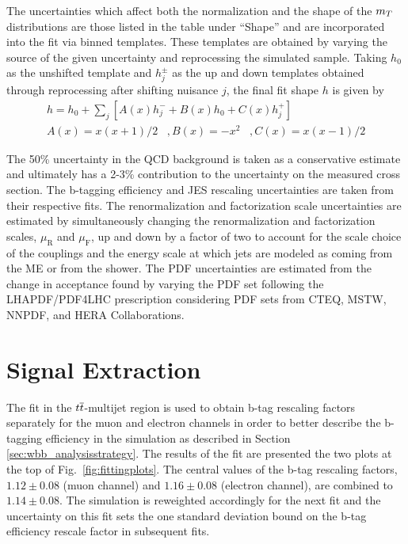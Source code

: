 The uncertainties which affect both the normalization and the
 shape of the $m_T$ distributions
 are those listed in
 the table under ``Shape'' and are
 incorporated into the fit via binned templates.
These templates 
 are obtained by varying the source
 of the given uncertainty and reprocessing the simulated sample.
Taking $h_0$ as the unshifted template
 and $h_j^\pm$ as the up and down templates obtained through reprocessing
 after shifting nuisance $j$, the final fit shape $h$ is given by
\begin{align}\label{eq:fitshape}
 h = h_0 + \sum_j[A(x)h^-_j + B(x)h_0 + C(x)h^+_j]\\
 A(x) = x(x+1)/2\;\;\;,
 B(x) = -x^2\;\;\;,
 C(x) = x(x-1)/2
\end{align}


The 50\% uncertainty in the QCD background is taken as a conservative estimate
 and ultimately has a 2-3\% contribution to the uncertainty on the measured cross section.
The b-tagging efficiency and JES rescaling uncertainties
 are taken from their respective fits.
The renormalization and factorization
 scale uncertainties are estimated by simultaneously
 changing the renormalization and factorization scales,
 $\mu_{\mathrm{R}}$ and $\mu_{\mathrm{F}}$,
 up and down by a factor of two to account
 for the scale choice of the couplings
 and the energy scale at which jets are modeled
 as coming from the ME or from the shower.
The PDF uncertainties are estimated from the change in
 acceptance found by varying the
 PDF set following the LHAPDF/PDF4LHC prescription
 \cite{Buckley:2014ana,Botje:2011sn,Alekhin:2011sk,Ball:2012cx}
 considering PDF sets from CTEQ, MSTW, NNPDF, and HERA Collaborations.

\FloatBarrier

\section{Signal Extraction}
\label{sec:results}

The fit in the $t\overline{t}$-multijet region
 is used to obtain b-tag rescaling factors separately for
 the muon and electron channels
 in order to better describe the
 b-tagging efficiency in the simulation
 as described in Section \ref{sec:wbb_analysisstrategy}.
The results of the fit are presented the
 two plots at the top of Fig.~\ref{fig:fittingplots}.
The central values of the b-tag rescaling factors, {$1.12 \pm 0.08$} (muon channel) and
 {$1.16 \pm 0.08$} (electron channel), are combined to {$1.14 \pm 0.08$}.
The simulation is reweighted accordingly for the next fit and
 the uncertainty on this fit sets the
 one standard deviation bound on the b-tag efficiency
 rescale factor in subsequent fits.

